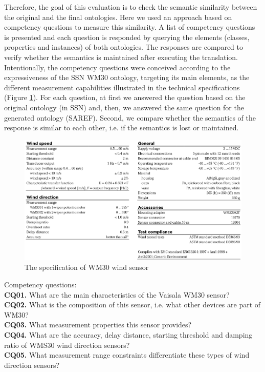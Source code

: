 \documentclass{sig-alternate-05-2015}
\begin{document}
Therefore, the goal of this evaluation is to check the semantic similarity between the original and the final ontologies. Here we used an approach based on competency questions to measure this similarity. A list of competency questions is presented and each question is responded by querying the elements (classes, properties and instances) of both ontologies. The responses are compared to verify whether the semantics is maintained after executing the translation. Intentionally, the competency questions were conceived according to the expressiveness of the SSN WM30 ontology, targeting its main elements, as the different measurement capabilities illustrated in the technical specifications (Figure \ref{fig:WM30specifications}). For each question, at first we answered the question based on the original ontology (in SSN) and, then, we answered the same question for the generated ontology (SAREF). Second, we compare whether the semantics of the response is similar to each other, i.e. if the semantics is lost or maintained. 

\begin{figure}[h!]
\centering
\includegraphics[scale=0.22]{WM30specifications}
\caption{The specification of WM30 wind sensor}
\label{fig:WM30specifications}
\end{figure}

Competency questions: 
\\\textbf{CQ01.} What are the main characteristics of the Vaisala WM30 sensor? 
\\\textbf{CQ02.} What is the composition of this sensor, i.e. what other devices are part of WM30?
\\\textbf{CQ03.} What measurement properties this sensor provides?
\\\textbf{CQ04.} What are the accuracy, delay distance, starting threshold and damping ratio of WMS30 wind direction sensors? 
\\\textbf{CQ05.} What measurement range constraints differentiate these types of wind direction sensors?
\end{document}
